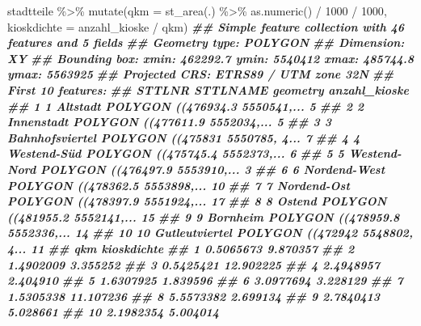 \documentclass[
  ngerman,
]{article}
\newenvironment{Shaded}{\begin{snugshade}}{\end{snugshade}}
\newcommand{\AttributeTok}[1]{\textcolor[rgb]{0.77,0.63,0.00}{#1}}
\newcommand{\DecValTok}[1]{\textcolor[rgb]{0.00,0.00,0.81}{#1}}
\newcommand{\DocumentationTok}[1]{\textcolor[rgb]{0.56,0.35,0.01}{\textbf{\textit{#1}}}}
\newcommand{\FunctionTok}[1]{\textcolor[rgb]{0.00,0.00,0.00}{#1}}
\newcommand{\NormalTok}[1]{#1}
\newcommand{\SpecialCharTok}[1]{\textcolor[rgb]{0.00,0.00,0.00}{#1}}
\begin{document}
\begin{Shaded}
\begin{Highlighting}[]
\NormalTok{stadtteile }\SpecialCharTok{\%\textgreater{}\%}
  \FunctionTok{mutate}\NormalTok{(}\AttributeTok{qkm =} \FunctionTok{st\_area}\NormalTok{(.) }\SpecialCharTok{\%\textgreater{}\%} \FunctionTok{as.numeric}\NormalTok{() }\SpecialCharTok{/} \DecValTok{1000} \SpecialCharTok{/} \DecValTok{1000}\NormalTok{,}
         \AttributeTok{kioskdichte =}\NormalTok{ anzahl\_kioske }\SpecialCharTok{/}\NormalTok{ qkm)}
\DocumentationTok{\#\# Simple feature collection with 46 features and 5 fields}
\DocumentationTok{\#\# Geometry type: POLYGON}
\DocumentationTok{\#\# Dimension:     XY}
\DocumentationTok{\#\# Bounding box:  xmin: 462292.7 ymin: 5540412 xmax: 485744.8 ymax: 5563925}
\DocumentationTok{\#\# Projected CRS: ETRS89 / UTM zone 32N}
\DocumentationTok{\#\# First 10 features:}
\DocumentationTok{\#\#    STTLNR        STTLNAME                       geometry anzahl\_kioske}
\DocumentationTok{\#\# 1       1        Altstadt POLYGON ((476934.3 5550541,...             5}
\DocumentationTok{\#\# 2       2      Innenstadt POLYGON ((477611.9 5552034,...             5}
\DocumentationTok{\#\# 3       3 Bahnhofsviertel POLYGON ((475831 5550785, 4...             7}
\DocumentationTok{\#\# 4       4     Westend{-}Süd POLYGON ((475745.4 5552373,...             6}
\DocumentationTok{\#\# 5       5    Westend{-}Nord POLYGON ((476497.9 5553910,...             3}
\DocumentationTok{\#\# 6       6    Nordend{-}West POLYGON ((478362.5 5553898,...            10}
\DocumentationTok{\#\# 7       7     Nordend{-}Ost POLYGON ((478397.9 5551924,...            17}
\DocumentationTok{\#\# 8       8          Ostend POLYGON ((481955.2 5552141,...            15}
\DocumentationTok{\#\# 9       9        Bornheim POLYGON ((478959.8 5552336,...            14}
\DocumentationTok{\#\# 10     10  Gutleutviertel POLYGON ((472942 5548802, 4...            11}
\DocumentationTok{\#\#          qkm kioskdichte}
\DocumentationTok{\#\# 1  0.5065673    9.870357}
\DocumentationTok{\#\# 2  1.4902009    3.355252}
\DocumentationTok{\#\# 3  0.5425421   12.902225}
\DocumentationTok{\#\# 4  2.4948957    2.404910}
\DocumentationTok{\#\# 5  1.6307925    1.839596}
\DocumentationTok{\#\# 6  3.0977694    3.228129}
\DocumentationTok{\#\# 7  1.5305338   11.107236}
\DocumentationTok{\#\# 8  5.5573382    2.699134}
\DocumentationTok{\#\# 9  2.7840413    5.028661}
\DocumentationTok{\#\# 10 2.1982354    5.004014}
\end{Highlighting}
\end{Shaded}
\end{document}
